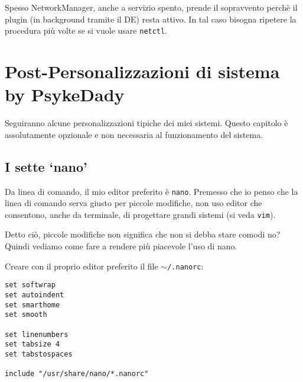 \documentclass[twoside,italian]{book}
\newcommand{\code}[1]{\texttt{#1}}
\begin{document}
    \begin{tcolorbox}[floatplacement=b,width=\textwidth,colback={white},title={ATTENZIONE:},colbacktitle=code,coltitle=white,colupper=code]
        Spesso NetworkManager, anche a servizio spento, prende il sopravvento perchè il plugin (in background tramite il \ac{DE}) resta attivo. In tal caso bisogna ripetere la procedura più volte se si vuole usare \code{netctl}.
    \end{tcolorbox}

\chapter{Post-Personalizzazioni di sistema by PsykeDady}
    Seguiranno alcune personalizzazioni tipiche dei miei sistemi. Questo capitolo è assolutamente opzionale e non necessaria al funzionamento del sistema.
    
\section{I sette `nano'}
    Da linea di comando, il mio editor preferito è \code{nano}. Premesso che io penso che la linea di comando serva giusto per piccole modifiche, non uso editor che consentono, anche da terminale, di progettare grandi sistemi (si veda \code{vim}).
    
    Detto ciò, piccole modifiche non significa che non si debba stare comodi no? Quindi vediamo come fare a rendere più piacevole l'uso di nano.

    Creare con il proprio editor preferito il file \code{$\sim$/.nanorc}:
\begin{lstlisting}
set softwrap
set autoindent
set smarthome
set smooth

set linenumbers
set tabsize 4
set tabstospaces

include "/usr/share/nano/*.nanorc"
\end{lstlisting}
        
\end{document}
